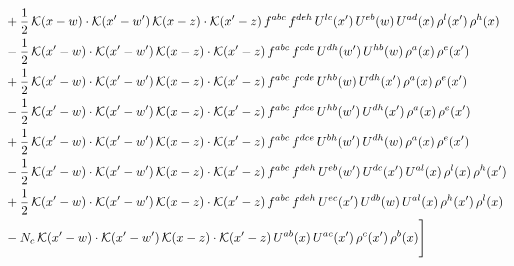 \documentclass[10pt]{article}
\numberwithin{equation}{section}
\begin{document}
\begin{align}
& +\frac{1}{2}\,\mathcal{K}(x-w)\cdot\mathcal{K}(x'-w')\,\mathcal{K}(x-z)\cdot\mathcal{K}(x'-z)\,f^{abc}\,f^{deh}\,U^{lc}(x')\,U^{eb}(w)\,U^{ad}(x)\,\rho^{l}(x')\,\rho^{h}(x)\notag\\
& -\frac{1}{2}\,\mathcal{K}(x'-w)\cdot\mathcal{K}(x'-w')\,\mathcal{K}(x-z)\cdot\mathcal{K}(x'-z)\,f^{abc}\,f^{cde}\,U^{dh}(w')\,U^{hb}(w)\,\rho^{a}(x)\,\rho^{e}(x')\notag\\
& +\frac{1}{2}\,\mathcal{K}(x'-w)\cdot\mathcal{K}(x'-w')\,\mathcal{K}(x-z)\cdot\mathcal{K}(x'-z)\,f^{abc}\,f^{cde}\,U^{hb}(w)\,U^{dh}(x')\,\rho^{a}(x)\,\rho^{e}(x')\notag\\
& -\frac{1}{2}\,\mathcal{K}(x'-w)\cdot\mathcal{K}(x'-w')\,\mathcal{K}(x-z)\cdot\mathcal{K}(x'-z)\,f^{abc}\,f^{dce}\,U^{hb}(w')\,U^{dh}(x')\,\rho^{a}(x)\,\rho^{e}(x')\notag\\
& +\frac{1}{2}\,\mathcal{K}(x'-w)\cdot\mathcal{K}(x'-w')\,\mathcal{K}(x-z)\cdot\mathcal{K}(x'-z)\,f^{abc}\,f^{dce}\,U^{bh}(w')\,U^{dh}(w)\,\rho^{a}(x)\,\rho^{e}(x')\notag\\
& -\frac{1}{2}\,\mathcal{K}(x'-w)\cdot\mathcal{K}(x'-w')\,\mathcal{K}(x-z)\cdot\mathcal{K}(x'-z)\,f^{abc}\,f^{deh}\,U^{eb}(w')\,U^{dc}(x')\,U^{al}(x)\,\rho^{l}(x)\,\rho^{h}(x')\notag\\
& +\frac{1}{2}\,\mathcal{K}(x'-w)\cdot\mathcal{K}(x'-w')\,\mathcal{K}(x-z)\cdot\mathcal{K}(x'-z)\,f^{abc}\,f^{deh}\,U^{ec}(x')\,U^{db}(w)\,U^{al}(x)\,\rho^{h}(x')\,\rho^{l}(x)\notag\\
& -N_{c}\,\mathcal{K}(x'-w)\cdot\mathcal{K}(x'-w')\,\mathcal{K}(x-z)\cdot\mathcal{K}(x'-z)\,U^{ab}(x)\,U^{ac}(x')\,\rho^{c}(x')\,\rho^{b}(x)\Bigg]
\end{align}
\end{document}
